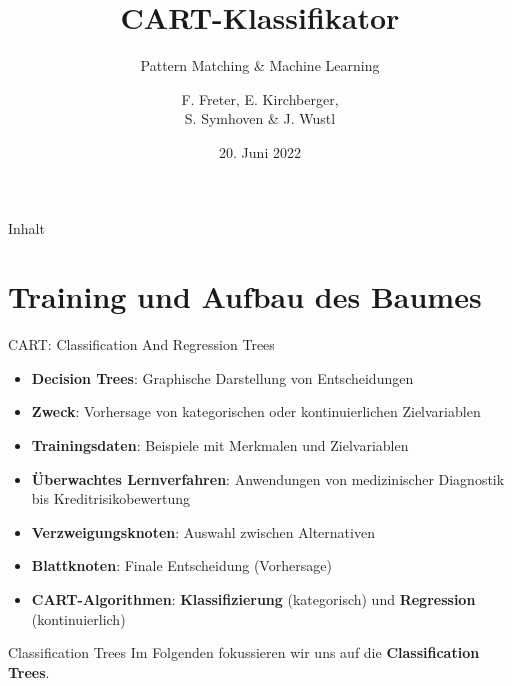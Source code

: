 \documentclass{beamer}
\title{CART-Klassifikator}
\subtitle{Pattern Matching \& Machine Learning}
\author{F. Freter, E. Kirchberger,\\S. Symhoven \& J. Wustl}
\institute{Sommersemester 2023}
\date{20. Juni 2022}
\begin{document}

\begin{frame}
	\maketitle %
\end{frame}


\begin{frame}{Inhalt}
	\tableofcontents %
\end{frame}




\section{Training und Aufbau des Baumes}
 
\begin{frame}{CART: Classification And Regression Trees}
	\begin{itemize}
		\item {\textbf{Decision Trees}: Graphische Darstellung von Entscheidungen}
		\item{\textbf{Zweck}: Vorhersage von kategorischen oder kontinuierlichen Zielvariablen}
		\item{\textbf{Trainingsdaten}: Beispiele mit Merkmalen und Zielvariablen}
		\item{\textbf{Überwachtes Lernverfahren}: Anwendungen von medizinischer Diagnostik bis Kreditrisikobewertung}
		\item{\textbf{Verzweigungsknoten}: Auswahl zwischen Alternativen}
		\item{\textbf{Blattknoten}: Finale Entscheidung (Vorhersage)}
		\item{\textbf{CART-Algorithmen}: \textbf{Klassifizierung} (kategorisch) und \textbf{Regression} (kontinuierlich)}
	\end{itemize}		
	
	\pause
	\begin{alertblock}{Classification Trees}
		Im Folgenden fokussieren wir uns auf die  \textbf{Classification Trees}.
	\end{alertblock}
\end{frame}
\end{document}
